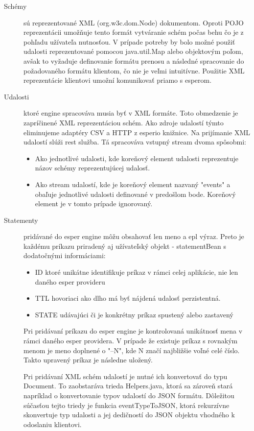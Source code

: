 		\begin{description}
			\item[Schémy] sú reprezentované XML (org.w3c.dom.Node) dokumentom. Oproti POJO reprezentácii umožňuje tento formát vytváranie schém počas behu čo je z pohľadu užívateľa nutnosťou. V prípade potreby by bolo možné použiť udalosti reprezentované pomocou java.util.Map alebo objektovým poľom, avšak to vyžaduje definovanie formátu prenosu a následné spracovanie do požadovaného formátu klientom, čo nie je veľmi intuitívne. Použitie XML reprezentácie klientovi umožní komunikovať priamo s esperom.
			
			\item[Udalosti] ktoré engine spracováva musia byť v XML formáte. Toto obmedzenie je zapríčinené XML reprezentáciou schém. Ako zdroje udalostí týmto eliminujeme adaptéry CSV a HTTP z esperio knižnice. Na prijímanie XML udalostí slúži rest služba. Tá spracováva vstupný stream dvoma spôsobmi:
			\begin{itemize}
				\item Ako jednotlivé udalosti, kde koreňový element udalosti reprezentuje názov schémy reprezentujúcej udalosť.
				\item Ako stream udalostí, kde je koreňový element nazvaný "events" a obaľuje jednotlivé udalosti definované v predošlom bode. Koreňový element je v tomto prípade ignorovaný.
			\end{itemize}
			
			\item[Statementy] pridávané do esper engine môžu obsahovať len meno a epl výraz. Preto je každému príkazu priradený aj užívateľský objekt - statementBean s dodatočnými informáciami:
			\begin{itemize}
				\item ID ktoré unikátne identifikuje príkaz v rámci celej aplikácie, nie len daného esper provideru
				\item TTL hovoriaci ako dlho má byť nájdená udalosť perzistentná.
				\item STATE udávajúci či je konkrétny príkaz spustený alebo zastavený
			\end{itemize}
				

			Pri pridávaní príkazu do esper engine je kontrolovaná unikátnosť mena v rámci daného esper providera. V prípade že existuje príkaz s rovnakým menom je meno doplnené o "--N", kde N značí najbližšie voľné celé číslo. Takto upravený príkaz je následne uložený.
			
			Pri pridávaní XML schém udalostí je nutné ich konvertovať do typu Document. To zaobstaráva trieda Helpers.java, ktorá sa zároveň stará napríklad o konvertovanie typov udalostí do JSON formátu. Dôležitou súčasťou tejto triedy je funkcia eventTypeToJSON, ktorá rekurzívne skonvertuje typ udalosti a jej dedičností do JSON objektu vhodného k odoslaniu klientovi.
			
		\end{description}
		
